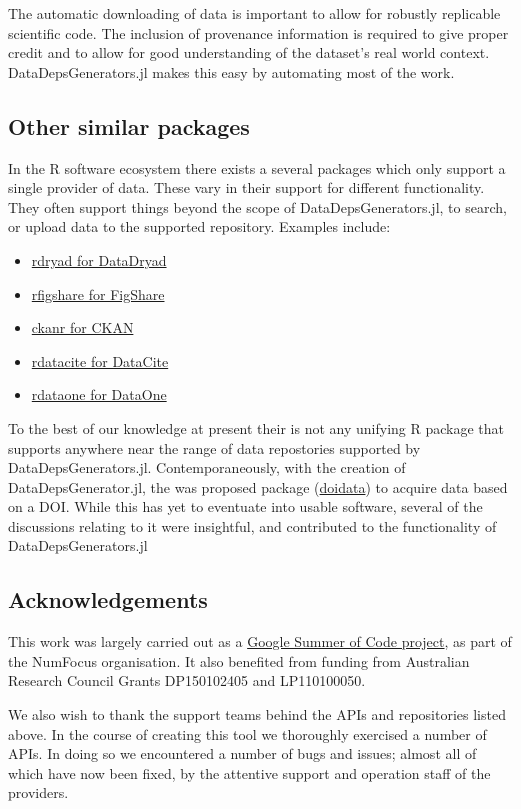 \documentclass{book}
\begin{document}
The automatic downloading of data is important to allow for robustly
replicable scientific code. The inclusion of provenance information is
required to give proper credit and to allow for good understanding of
the dataset's real world context. DataDepsGenerators.jl makes this easy
by automating most of the work.

\hypertarget{other-similar-packages}{%
	\subsection{Other similar packages}\label{other-similar-packages}}

In the R software ecosystem there exists a several packages which only
support a single provider of data. These vary in their support for
different functionality. They often support things beyond the scope of
DataDepsGenerators.jl, to search, or upload data to the supported
repository. Examples include:

\begin{itemize}
	\item
	\href{https://github.com/ropensci/rdryad}{rdryad for DataDryad}
	\item
	\href{https://github.com/ropensci/rfigshare}{rfigshare for FigShare}
	\item
	\href{https://github.com/ropensci/ckanr}{ckanr for CKAN}
	\item
	\href{https://github.com/ropensci/rdatacite}{rdatacite for DataCite}
	\item
	\href{https://github.com/DataONEorg/rdataone}{rdataone for DataOne}
\end{itemize}

To the best of our knowledge at present their is not any unifying R
package that supports anywhere near the range of data repostories
supported by DataDepsGenerators.jl. Contemporaneously, with the creation
of DataDepsGenerator.jl, the was proposed package
(\href{https://github.com/ropenscilabs/doidata}{doidata}) to acquire
data based on a DOI. While this has yet to eventuate into usable
software, several of the discussions relating to it were insightful, and
contributed to the functionality of DataDepsGenerators.jl

\hypertarget{acknowledgements}{%
\subsection{Acknowledgements}\label{acknowledgements}}

This work was largely carried out as a
\href{https://medium.com/@sebastinsanty/google-summer-of-code-2018-julia-computing-report-8d3f553d7050}{Google
Summer of Code project}, as part of the NumFocus organisation. It also
benefited from funding from Australian Research Council Grants
DP150102405 and LP110100050.

We also wish to thank the support teams behind the APIs and repositories
listed above. In the course of creating this tool we thoroughly
exercised a number of APIs. In doing so we encountered a number of bugs
and issues; almost all of which have now been fixed, by the attentive
support and operation staff of the providers.
\end{document}
